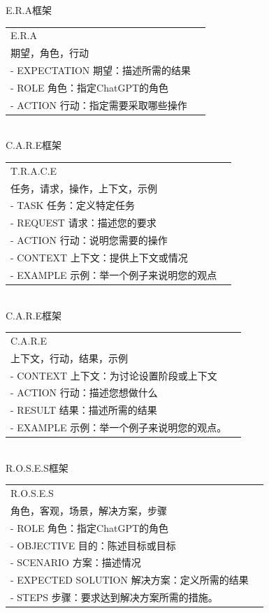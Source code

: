 \documentclass[12pt]{book}
\begin{document}
	
	E.R.A框架\\
\begin{tabular}{|p{16cm}|p{3cm}|}
	\hline
		E.R.A \\
		期望，角色，行动 \\
		- EXPECTATION 期望：描述所需的结果 \\
		- ROLE 角色：指定ChatGPT的角色 \\
		- ACTION 行动：指定需要采取哪些操作 \\
		\hline
\end{tabular}\\
	
	
C.A.R.E框架\\
\begin{tabular}{|p{16cm}|p{3cm}|}
	\hline
		T.R.A.C.E \\
		任务，请求，操作，上下文，示例 \\
		- TASK 任务：定义特定任务\\
		- REQUEST 请求：描述您的要求\\
		- ACTION 行动：说明您需要的操作\\
		- CONTEXT 上下文：提供上下文或情况\\
		- EXAMPLE 示例：举一个例子来说明您的观点\\
		\hline
\end{tabular}\\
	
	
C.A.R.E框架\\
\begin{tabular}{|p{16cm}|p{3cm}|}
	\hline
		C.A.R.E \\
		上下文，行动，结果，示例\\
		- CONTEXT 上下文：为讨论设置阶段或上下文 \\
		- ACTION 行动：描述您想做什么 \\
		- RESULT 结果：描述所需的结果 \\
		- EXAMPLE 示例：举一个例子来说明您的观点。\\
		\hline
\end{tabular}\\
	
	
R.O.S.E.S框架\\
\begin{tabular}{|p{16cm}|p{3cm}|}
	\hline
		R.O.S.E.S \\
		角色，客观，场景，解决方案，步骤\\
		- ROLE 角色：指定ChatGPT的角色 \\
		- OBJECTIVE 目的：陈述目标或目标\\
		- SCENARIO 方案：描述情况\\
		- EXPECTED SOLUTION 解决方案：定义所需的结果\\
		- STEPS 步骤：要求达到解决方案所需的措施。\\
		\hline
	\end{tabular}\\
	
\end{document}
